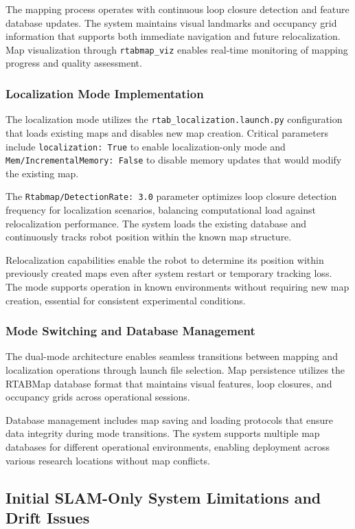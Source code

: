 The mapping process operates with continuous loop closure detection and feature database updates. The system maintains visual landmarks and occupancy grid information that supports both immediate navigation and future relocalization. Map visualization through \texttt{rtabmap\_viz} enables real-time monitoring of mapping progress and quality assessment.

\subsubsection{Localization Mode Implementation}

The localization mode utilizes the \texttt{rtab\_localization.launch.py} configuration that loads existing maps and disables new map creation. Critical parameters include \texttt{localization: True} to enable localization-only mode and \texttt{Mem/IncrementalMemory: False} to disable memory updates that would modify the existing map.

The \texttt{Rtabmap/DetectionRate: 3.0} parameter optimizes loop closure detection frequency for localization scenarios, balancing computational load against relocalization performance. The system loads the existing database and continuously tracks robot position within the known map structure.

Relocalization capabilities enable the robot to determine its position within previously created maps even after system restart or temporary tracking loss. The mode supports operation in known environments without requiring new map creation, essential for consistent experimental conditions.

\subsubsection{Mode Switching and Database Management}

The dual-mode architecture enables seamless transitions between mapping and localization operations through launch file selection. Map persistence utilizes the RTABMap database format that maintains visual features, loop closures, and occupancy grids across operational sessions.

Database management includes map saving and loading protocols that ensure data integrity during mode transitions. The system supports multiple map databases for different operational environments, enabling deployment across various research locations without map conflicts.

\subsection{Initial SLAM-Only System Limitations and Drift Issues}

